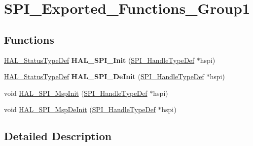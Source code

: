 \hypertarget{group___s_p_i___exported___functions___group1}{}\section{S\+P\+I\+\_\+\+Exported\+\_\+\+Functions\+\_\+\+Group1}
\label{group___s_p_i___exported___functions___group1}
\subsection*{Functions}
\begin{DoxyCompactItemize}
\item 
\mbox{\label{group___s_p_i___exported___functions___group1_gaadb9d40e710c714d96b2501996658c44}} 
\mbox{\hyperlink{stm32f7xx__hal__def_8h_a63c0679d1cb8b8c684fbb0632743478f}{H\+A\+L\+\_\+\+Status\+Type\+Def}} {\bfseries H\+A\+L\+\_\+\+S\+P\+I\+\_\+\+Init} (\mbox{\hyperlink{group___s_p_i___exported___types_gab3bd115785297692c125528b7293566b}{S\+P\+I\+\_\+\+Handle\+Type\+Def}} $\ast$hspi)
\item 
\mbox{\label{group___s_p_i___exported___functions___group1_gaca2db2a7bbed96ac013c565080fb61f2}} 
\mbox{\hyperlink{stm32f7xx__hal__def_8h_a63c0679d1cb8b8c684fbb0632743478f}{H\+A\+L\+\_\+\+Status\+Type\+Def}} {\bfseries H\+A\+L\+\_\+\+S\+P\+I\+\_\+\+De\+Init} (\mbox{\hyperlink{group___s_p_i___exported___types_gab3bd115785297692c125528b7293566b}{S\+P\+I\+\_\+\+Handle\+Type\+Def}} $\ast$hspi)
\item 
void \mbox{\hyperlink{group___s_p_i___exported___functions___group1_ga17f583be14b22caffa6c4e56dcd035ef}{H\+A\+L\+\_\+\+S\+P\+I\+\_\+\+Msp\+Init}} (\mbox{\hyperlink{group___s_p_i___exported___types_gab3bd115785297692c125528b7293566b}{S\+P\+I\+\_\+\+Handle\+Type\+Def}} $\ast$hspi)
\item 
void \mbox{\hyperlink{group___s_p_i___exported___functions___group1_gabadc4d4974af1afd943e8d13589068e1}{H\+A\+L\+\_\+\+S\+P\+I\+\_\+\+Msp\+De\+Init}} (\mbox{\hyperlink{group___s_p_i___exported___types_gab3bd115785297692c125528b7293566b}{S\+P\+I\+\_\+\+Handle\+Type\+Def}} $\ast$hspi)
\end{DoxyCompactItemize}


\subsection{Detailed Description}


